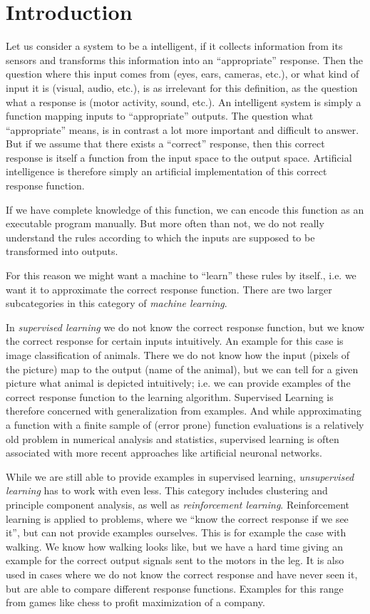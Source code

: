 
\chapter{Introduction}
    Let us consider a system to be a intelligent, if it collects information from its sensors and transforms this information into an ``appropriate'' response. Then the question where this input comes from (eyes, ears, cameras, etc.), or what kind of input it is (visual, audio, etc.), is as irrelevant for this definition, as the question what a response is (motor activity, sound, etc.). An intelligent system is simply a function mapping inputs to ``appropriate'' outputs.  The question what ``appropriate'' means, is in contrast a lot more important and difficult to answer. But if we assume that there exists a ``correct'' response, then this correct response is itself a function from the input space to the output space. Artificial intelligence is therefore simply an artificial implementation of this correct response function. 

    If we have complete knowledge of this function, we can encode this function as an executable program manually. But more often than not, we do not really understand the rules according to which the inputs are supposed to be transformed into outputs. 

    For this reason we might want a machine to ``learn'' these rules by itself., i.e. we want it to approximate the correct response function. There are two larger subcategories in this category of \emph{machine learning}. 
    
    In \emph{supervised learning} we do not know the correct response function, but we know the correct response for certain inputs intuitively. An example for this case is image classification of animals. There we do not know how the input (pixels of the picture) map to the output (name of the animal), but we can tell for a given picture what animal is depicted intuitively; i.e. we can provide examples of the correct response function to the learning algorithm. Supervised Learning is therefore concerned with generalization from examples. And while approximating a function with a finite sample of (error prone) function evaluations is a relatively old problem in numerical analysis and statistics, supervised learning is often associated with more recent approaches like artificial neuronal networks. 

    While we are still able to provide examples in supervised learning, \emph{unsupervised learning} has to work with even less. This category includes clustering and principle component analysis, as well as \emph{reinforcement learning}. Reinforcement learning is applied to problems, where we ``know the correct response if we see it'', but can not provide examples ourselves. This is for example the case with walking. We know how walking looks like, but we have a hard time giving an example for the correct output signals sent to the motors in the leg. It is also used in cases where we do not know the correct response and have never seen it, but are able to compare different response functions. Examples for this range from games like chess to profit maximization of a company. 

